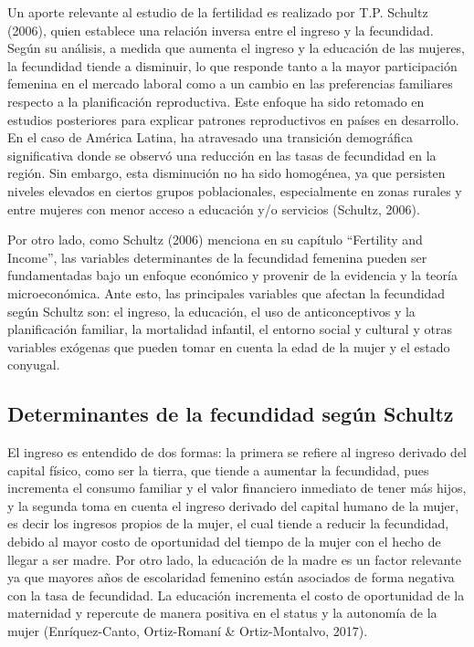 \documentclass[Royal,times,sageh]{sagej}
\begin{document}
Un aporte relevante al estudio de la fertilidad es realizado por T.P.
Schultz (2006), quien establece una relación inversa entre el ingreso y
la fecundidad. Según su análisis, a medida que aumenta el ingreso y la
educación de las mujeres, la fecundidad tiende a disminuir, lo que
responde tanto a la mayor participación femenina en el mercado laboral
como a un cambio en las preferencias familiares respecto a la
planificación reproductiva. Este enfoque ha sido retomado en estudios
posteriores para explicar patrones reproductivos en países en
desarrollo. En el caso de América Latina, ha atravesado una transición
demográfica significativa donde se observó una reducción en las tasas de
fecundidad en la región. Sin embargo, esta disminución no ha sido
homogénea, ya que persisten niveles elevados en ciertos grupos
poblacionales, especialmente en zonas rurales y entre mujeres con menor
acceso a educación y/o servicios (Schultz, 2006).

Por otro lado, como Schultz (2006) menciona en su capítulo ``Fertility
and Income'', las variables determinantes de la fecundidad femenina
pueden ser fundamentadas bajo un enfoque económico y provenir de la
evidencia y la teoría microeconómica. Ante esto, las principales
variables que afectan la fecundidad según Schultz son: el ingreso, la
educación, el uso de anticonceptivos y la planificación familiar, la
mortalidad infantil, el entorno social y cultural y otras variables
exógenas que pueden tomar en cuenta la edad de la mujer y el estado
conyugal.

\subsection{Determinantes de la fecundidad según
Schultz}\label{determinantes-de-la-fecundidad-seguxfan-schultz}

El ingreso es entendido de dos formas: la primera se refiere al ingreso
derivado del capital físico, como ser la tierra, que tiende a aumentar
la fecundidad, pues incrementa el consumo familiar y el valor financiero
inmediato de tener más hijos, y la segunda toma en cuenta el ingreso
derivado del capital humano de la mujer, es decir los ingresos propios
de la mujer, el cual tiende a reducir la fecundidad, debido al mayor
costo de oportunidad del tiempo de la mujer con el hecho de llegar a ser
madre. Por otro lado, la educación de la madre es un factor relevante ya
que mayores años de escolaridad femenino están asociados de forma
negativa con la tasa de fecundidad. La educación incrementa el costo de
oportunidad de la maternidad y repercute de manera positiva en el status
y la autonomía de la mujer (Enríquez-Canto, Ortiz-Romaní \&
Ortiz-Montalvo, 2017).
\end{document}
